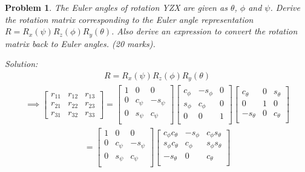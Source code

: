 \documentclass{article}
\newtheorem{prob}{Problem}
\newenvironment{solution}{\emph{Solution:}}{}
\begin{document}
\newpage

\begin{prob}
  The Euler angles of rotation YZX are given as $\theta$, $\phi$ and $\psi$.
  Derive the rotation matrix corresponding to the Euler angle representation $R = R_x(\psi) R_z(\phi) R_y(\theta)$. Also derive an expression to convert the rotation matrix back to Euler angles. (20 marks).
\end{prob}
\begin{solution}
\begin{align}
  R = R_x(\psi) R_z(\phi) R_y(\theta)
\end{align}
\begin{align}
  \implies \begin{bmatrix}
    r_{11} & r_{12} & r_{13}  \\
    r_{21} & r_{22} & r_{23}  \\
    r_{31} & r_{32} & r_{33}  
  \end{bmatrix}
  =
  \begin{bmatrix}
    1 & 0 & 0\\
    0 & c_\psi & -s_\psi \\
    0 & s_\psi & c_\psi \\
  \end{bmatrix}
  \begin{bmatrix}
    c_\phi & -s_\phi & 0 \\
    s_\phi & c_\phi & 0 \\
    0 & 0 & 1\\
  \end{bmatrix}
  \begin{bmatrix}
    c_\theta & 0 & s_\theta \\
    0 & 1 & 0\\
    -s_\theta & 0 & c_\theta \\
  \end{bmatrix}
\end{align}
\begin{align}
  = \begin{bmatrix}
    1 & 0 & 0\\
    0 & c_\psi & -s_\psi \\
    0 & s_\psi & c_\psi \\
  \end{bmatrix}
  \begin{bmatrix}
    c_\phi c_\theta & - s_\phi & c_\phi s_\theta \\
    s_\phi c_\theta &   c_\phi & s_\phi s_\theta \\
    -s_\theta & 0 & c_\theta \\

\end{bmatrix}
\end{align}
\end{solution}
\end{document}
